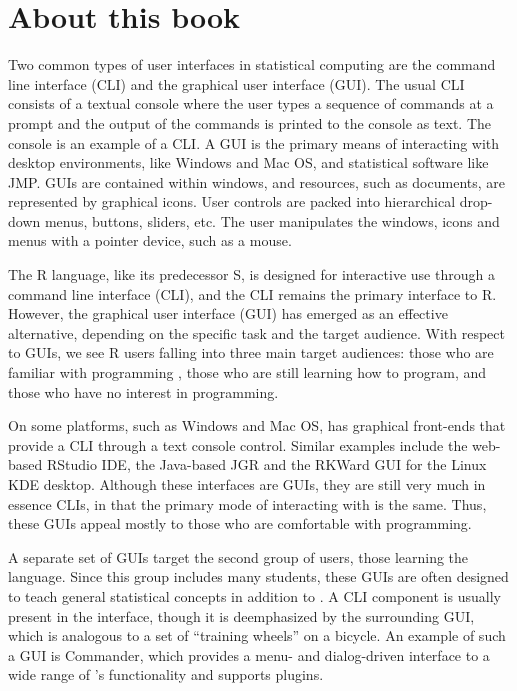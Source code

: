 


\section*{About this book}
\label{sec:about}

Two common types of user interfaces in statistical computing are the
command line interface (CLI) and the graphical user interface
(GUI). The usual CLI consists of a textual console where the user
types a sequence of commands at a prompt and the output of the
commands is printed to the console as text. The  console
is an example of a CLI. A GUI is the primary means of interacting with
desktop environments, like Windows and Mac OS, and statistical
software like JMP. GUIs are contained within windows, and
resources, such as documents, are represented by graphical icons.
User controls are packed into hierarchical drop-down menus, buttons,
sliders, etc. The user manipulates the windows, icons and menus with a
pointer device, such as a mouse.

The R language, like its predecessor S, is designed for interactive
use through a command line interface (CLI), and the CLI remains the
primary interface to R. However, the graphical user interface (GUI)
has emerged as an effective alternative, depending on the specific
task and the target audience.  With respect to GUIs, we see R users
falling into three main target audiences: those who are familiar with
programming , those who are still learning how to program,
and those who have no interest in programming.

On some platforms, such as Windows and Mac OS, \R{} has graphical
front-ends that provide a CLI through a text console control. Similar
examples include the web-based RStudio\texttrademark{} IDE, the
Java-based JGR and the RKWard GUI for the Linux KDE desktop. Although
these interfaces are GUIs, they are still very much in essence CLIs,
in that the primary mode of interacting with  is the
same. Thus, these GUIs appeal mostly to those who are comfortable with
 programming.

A separate set of GUIs target the second group of users, those
learning the  language. Since this group includes many
students, these GUIs are often designed to teach general statistical
concepts in addition to .  A CLI component is usually
present in the interface, though it is deemphasized by the surrounding
GUI, which is analogous to a set of ``training wheels'' on a
bicycle. An example of such a GUI is  Commander, which
provides a menu- and dialog-driven interface to a wide range of \R's
functionality and supports plugins.

